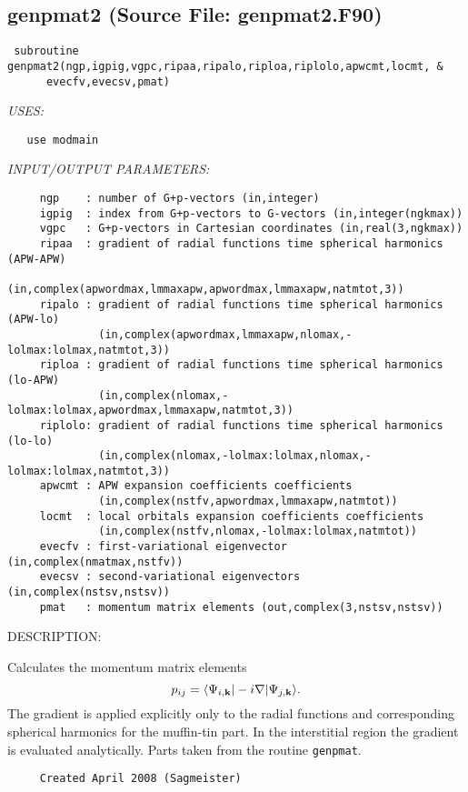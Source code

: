 \documentclass[11pt]{article}
\begin{document}
\subsection{genpmat2 (Source File: genpmat2.F90)}


\begin{verbatim} subroutine genpmat2(ngp,igpig,vgpc,ripaa,ripalo,riploa,riplolo,apwcmt,locmt, &
      evecfv,evecsv,pmat)\end{verbatim}{\em USES:}
\begin{verbatim}   use modmain\end{verbatim}{\em INPUT/OUTPUT PARAMETERS:}
\begin{verbatim}     ngp    : number of G+p-vectors (in,integer)
     igpig  : index from G+p-vectors to G-vectors (in,integer(ngkmax))
     vgpc   : G+p-vectors in Cartesian coordinates (in,real(3,ngkmax))
     ripaa  : gradient of radial functions time spherical harmonics (APW-APW)
              (in,complex(apwordmax,lmmaxapw,apwordmax,lmmaxapw,natmtot,3))
     ripalo : gradient of radial functions time spherical harmonics (APW-lo)
              (in,complex(apwordmax,lmmaxapw,nlomax,-lolmax:lolmax,natmtot,3))
     riploa : gradient of radial functions time spherical harmonics (lo-APW)
              (in,complex(nlomax,-lolmax:lolmax,apwordmax,lmmaxapw,natmtot,3))
     riplolo: gradient of radial functions time spherical harmonics (lo-lo)
              (in,complex(nlomax,-lolmax:lolmax,nlomax,-lolmax:lolmax,natmtot,3))
     apwcmt : APW expansion coefficients coefficients
              (in,complex(nstfv,apwordmax,lmmaxapw,natmtot))
     locmt  : local orbitals expansion coefficients coefficients
              (in,complex(nstfv,nlomax,-lolmax:lolmax,natmtot))
     evecfv : first-variational eigenvector (in,complex(nmatmax,nstfv))
     evecsv : second-variational eigenvectors (in,complex(nstsv,nstsv))
     pmat   : momentum matrix elements (out,complex(3,nstsv,nstsv))\end{verbatim}
{\sf DESCRIPTION:\\ }


     Calculates the momentum matrix elements
     $$ p_{ij}=\langle\Psi_{i,{\bf k}}|-i\nabla|\Psi_{j,{\bf k}}\rangle. $$
     The gradient is applied explicitly only to the radial functions and 
     corresponding spherical harmonics for the muffin-tin part. In the 
     interstitial region the gradient is evaluated analytically.
     Parts taken from the routine {\tt genpmat}.
  
\begin{verbatim}     Created April 2008 (Sagmeister)\end{verbatim}
\end{document}
